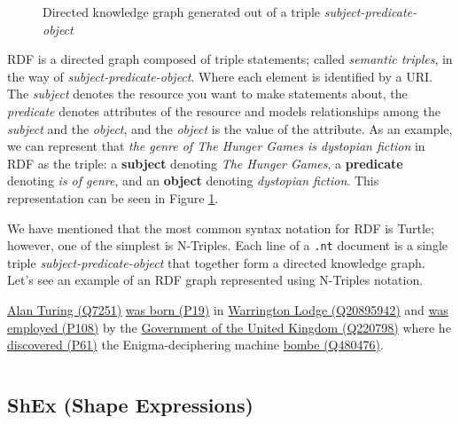 \begin{figure}[ht]
    \centering
    
    \caption{Directed knowledge graph generated out of a triple \textit{subject-predicate-object}}
    \label{fig:RDF}
\end{figure}

RDF is a directed graph composed of triple statements; called \textit{semantic triples}, in the way of \textit{subject-predicate-object}. Where each element is identified by a URI. The \textit{subject} denotes the resource you want to make statements about, the \textit{predicate} denotes attributes of the resource and models relationships among the \textit{subject} and the \textit{object}, and the \textit{object} is the value of the attribute. As an example, we can represent that \textit{the genre of The Hunger Games is dystopian fiction} in RDF as the triple: a \textbf{subject} denoting \textit{The Hunger Games}, a \textbf{predicate} denoting \textit{is of genre}, and an \textbf{object} denoting \textit{dystopian fiction}. This representation can be seen in Figure \ref{fig:RDF}.

We have mentioned that the most common syntax notation for RDF is Turtle; however, one of the simplest is N-Triples. Each line of a \texttt{.nt} document is a single triple \textit{subject-predicate-object} that together form a directed knowledge graph. Let's see an example of an RDF graph represented using N-Triples notation.

\begin{example}
    \href{https://www.wikidata.org/entity/Q7251}{Alan Turing (Q7251)} \href{https://www.wikidata.org/entity/P19}{was born (P19)} in \href{https://www.wikidata.org/entity/Q20895942}{Warrington Lodge (Q20895942)} and \href{https://www.wikidataWShEx.org/entity/P108}{was employed (P108)} by the \href{https://www.wikidata.org/entity/Q220798}{Government of the United Kingdom (Q220798)} where he \href{https://www.wikidata.org/entity/P61}{discovered (P61)} the Enigma-deciphering machine \href{https://www.wikidata.org/entity/Q480476}{bombe (Q480476)}.
\end{example}

\begin{dumps}
    \inputminted{turtle}{code/listings/6-3_serialization.nt}
\end{dumps}

\subsection{ShEx (Shape Expressions)}


